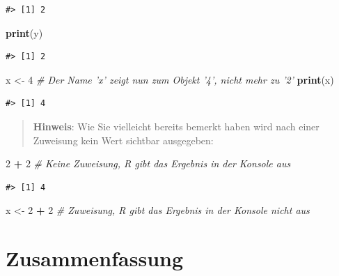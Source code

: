 \documentclass[]{book}
\newenvironment{Shaded}{\begin{snugshade}}{\end{snugshade}}
\newcommand{\KeywordTok}[1]{\textcolor[rgb]{0.13,0.29,0.53}{\textbf{#1}}}
\newcommand{\DecValTok}[1]{\textcolor[rgb]{0.00,0.00,0.81}{#1}}
\newcommand{\StringTok}[1]{\textcolor[rgb]{0.31,0.60,0.02}{#1}}
\newcommand{\CommentTok}[1]{\textcolor[rgb]{0.56,0.35,0.01}{\textit{#1}}}
\newcommand{\OperatorTok}[1]{\textcolor[rgb]{0.81,0.36,0.00}{\textbf{#1}}}
\newcommand{\NormalTok}[1]{#1}
\begin{document}
\begin{verbatim}
#> [1] 2
\end{verbatim}

\begin{Shaded}
\begin{Highlighting}[]
\KeywordTok{print}\NormalTok{(y)}
\end{Highlighting}
\end{Shaded}

\begin{verbatim}
#> [1] 2
\end{verbatim}

\begin{Shaded}
\begin{Highlighting}[]
\NormalTok{x <-}\StringTok{ }\DecValTok{4} \CommentTok{# Der Name 'x' zeigt nun zum Objekt '4', nicht mehr zu '2'}
\KeywordTok{print}\NormalTok{(x)}
\end{Highlighting}
\end{Shaded}

\begin{verbatim}
#> [1] 4
\end{verbatim}

\begin{quote}
\textbf{Hinweis}: Wie Sie vielleicht bereits bemerkt haben wird nach
einer Zuweisung kein Wert sichtbar ausgegeben:
\end{quote}

\begin{Shaded}
\begin{Highlighting}[]
\DecValTok{2} \OperatorTok{+}\StringTok{ }\DecValTok{2} \CommentTok{# Keine Zuweisung, R gibt das Ergebnis in der Konsole aus}
\end{Highlighting}
\end{Shaded}

\begin{verbatim}
#> [1] 4
\end{verbatim}

\begin{Shaded}
\begin{Highlighting}[]
\NormalTok{x <-}\StringTok{ }\DecValTok{2} \OperatorTok{+}\StringTok{ }\DecValTok{2} \CommentTok{# Zuweisung, R gibt das Ergebnis in der Konsole nicht aus}
\end{Highlighting}
\end{Shaded}

\section{Zusammenfassung}\label{zusammenfassung}
\end{document}
